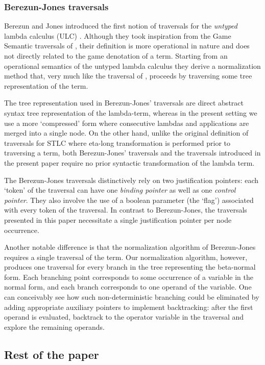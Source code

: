 \documentclass{article}
\theoremstyle{definition}
\begin{document}
\subsubsection{Berezun-Jones traversals}
Berezun and Jones  introduced the first notion of traversals for the \emph{untyped} lambda calculus (ULC) \cite{JonesBerezunLLL}. Although they took inspiration from the Game Semantic traversals of \cite{Ong2006,BlumGalop2008}, their definition is more operational in nature and does not directly related to the game denotation of a term. Starting from an operational semantics of the untyped lambda calculus they derive a normalization method that, very much like the traversal of \cite{Ong2006, BlumPhd}, proceeds by traversing some tree representation of the term.

The tree representation used in Berezun-Jones' traversals are direct abstract syntax tree representation of the lambda-term, whereas in the present setting we use a more `compressed' form where consecutive lambdas and applications are merged into a single node. On the other hand, unlike the original definition of traversals for STLC where eta-long transformation is performed prior to traversing a term, both Berezun-Jones' traversals and the traversals introduced in the present paper require no prior syntactic transformation of the lambda term.

The Berezun-Jones traversals distinctively rely on two justification pointers: each `token' of the traversal can have one \emph{binding pointer} as well as one \emph{control pointer}. They also involve the use of a boolean parameter (the `flag') associated with every token of the traversal. In contrast to Berezun-Jones, the traversals presented in this paper necessitate a single justification pointer per node occurrence.

Another notable difference is that the normalization algorithm of Berezun-Jones requires a single traversal of the term. Our normalization algorithm, however, produces one traversal for every branch in the tree representing the beta-normal form. Each branching point corresponds to some occurrence of a variable in the normal form, and each branch corresponds to one operand of the variable. One can conceivably see how such non-deterministic branching could be eliminated by adding appropriate auxiliary pointers to implement backtracking: after the first operand is evaluated, backtrack to the operator variable in the traversal and explore the remaining operands.

\subsection{Rest of the paper}
\end{document}
